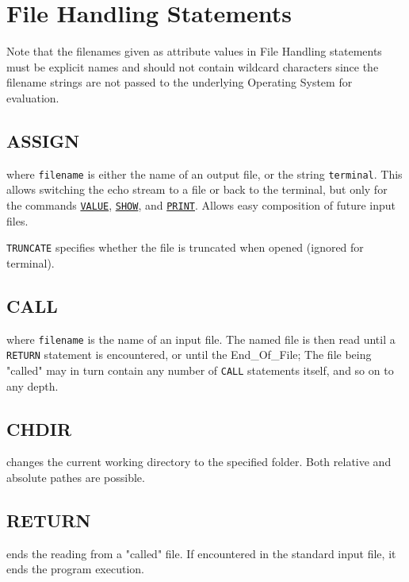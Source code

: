\chapter{File Handling Statements}
\label{chap:files}

Note that the filenames given as attribute values in File Handling statements 
must be explicit names and should not contain wildcard characters since the 
filename strings are not passed to the underlying Operating System for evaluation.


\section{ASSIGN}
\label{sec:assign}

where \texttt{filename} is either the name of an output file, or the
string \texttt{terminal}.
This allows switching the echo stream to a file or back to the terminal,
but only for the commands \hyperref[sec:value]{\texttt{VALUE}}, 
\hyperref[sec:show]{\texttt{SHOW}}, and \hyperref[sec:print]{\texttt{PRINT}}. 
Allows easy composition of future \madx input files.

\texttt{TRUNCATE} specifies whether the file is truncated when opened 
(ignored for terminal). 


\section{CALL}
\label{sec:call}
where \texttt{filename} is the name of an input file. The named file is
then read until a \texttt{RETURN} statement is encountered, or until the
End\_Of\_File; The file being "called" may in turn contain any number of
\texttt{CALL} statements itself, and so on to any depth.


\section{CHDIR}
\label{sec:chdir}
changes the current working directory to the specified folder. Both relative
and absolute pathes are possible.


\section{RETURN}
\label{Sec:return}
ends the reading from a "called" file. If encountered in the standard
input file, it ends the program execution.  


